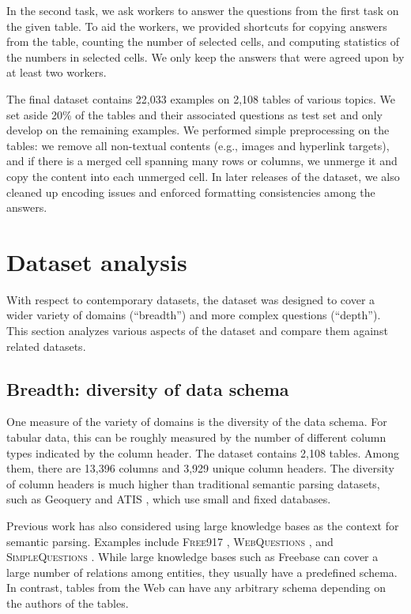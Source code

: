 In the second task, we ask workers to answer
the questions from the first task on the given table.
To aid the workers, we provided shortcuts
for copying answers from the table,
counting the number of selected cells,
and computing statistics of the numbers in selected cells.
We only keep the answers that were agreed upon
by at least two workers.

The final dataset contains 22,033 examples
on 2,108 tables of various topics.
We set aside 20\% of the tables and their associated questions
as test set and only develop on the remaining examples.
We performed simple preprocessing on the tables:
we remove all non-textual contents
(e.g., images and hyperlink targets),
and if there is a merged cell spanning many rows or columns,
we unmerge it and copy the content into each unmerged cell.
In later releases of the dataset,
we also cleaned up encoding issues and
enforced formatting consistencies among the answers.

\section{Dataset analysis}

With respect to contemporary datasets,
the \wtq dataset was designed to cover a wider variety of domains
(``breadth'') and more complex questions (``depth'').
This section analyzes various aspects of the dataset
and compare them against related datasets.

\subsection{Breadth: diversity of data schema}

One measure of the variety of domains
is the diversity of the data schema.
For tabular data, this can be roughly measured
by the number of different column types
indicated by the column header.
The \wtq dataset contains 2,108 tables.
Among them, there are 13,396 columns
and 3,929 unique column headers.
The diversity of column headers
is much higher than traditional semantic parsing datasets,
such as Geoquery \cite{Zelle1996LearningTP}
and ATIS \cite{Price1990EvaluationOS},
which use small and fixed databases.

Previous work has also considered using
large knowledge bases as the context
for semantic parsing.
Examples include
\textsc{Free917} \cite{Cai2013LargescaleSP},
\textsc{WebQuestions} \cite{Berant2013SemanticPO},
and \textsc{SimpleQuestions} \cite{Bordes2015LargescaleSQ}.
While large knowledge bases
such as Freebase \cite{Bollacker2008FreebaseAC}
can cover a large number of relations
among entities,
they usually have a predefined schema.
In contrast, tables from the Web can have
any arbitrary schema depending on the authors
of the tables.

